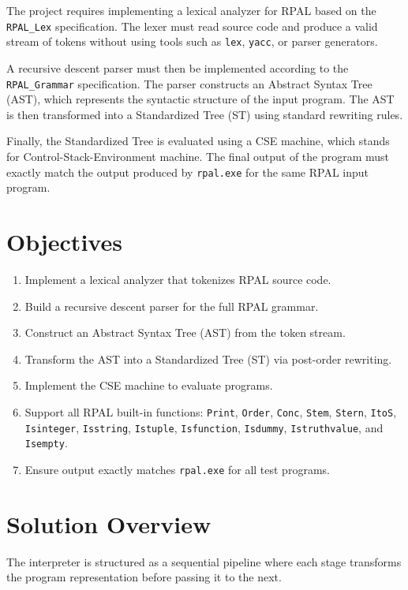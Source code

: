 \documentclass[12pt,a4paper]{article}
\begin{document}
The project requires implementing a lexical analyzer for RPAL based on the \texttt{RPAL\_Lex} specification. The lexer must read source code and produce a valid stream of tokens without using tools such as \texttt{lex}, \texttt{yacc}, or parser generators.

A recursive descent parser must then be implemented according to the \texttt{RPAL\_Grammar} specification. The parser constructs an Abstract Syntax Tree (AST), which represents the syntactic structure of the input program. The AST is then transformed into a Standardized Tree (ST) using standard rewriting rules.

Finally, the Standardized Tree is evaluated using a CSE machine, which stands for Control-Stack-Environment machine. The final output of the program must exactly match the output produced by \texttt{rpal.exe} for the same RPAL input program.

\section{Objectives}

\begin{enumerate}[label=\arabic*.]
    \item Implement a lexical analyzer that tokenizes RPAL source code.
    \item Build a recursive descent parser for the full RPAL grammar.
    \item Construct an Abstract Syntax Tree (AST) from the token stream.
    \item Transform the AST into a Standardized Tree (ST) via post-order rewriting.
    \item Implement the CSE machine to evaluate programs.
    \item Support all RPAL built-in functions: \texttt{Print}, \texttt{Order}, \texttt{Conc}, \texttt{Stem}, \texttt{Stern}, \texttt{ItoS}, \texttt{Isinteger}, \texttt{Isstring}, \texttt{Istuple}, \texttt{Isfunction}, \texttt{Isdummy}, \texttt{Istruthvalue}, and \texttt{Isempty}.
    \item Ensure output exactly matches \texttt{rpal.exe} for all test programs.
\end{enumerate}

\section{Solution Overview}

The interpreter is structured as a sequential pipeline where each stage transforms the program representation before passing it to the next.
\end{document}
